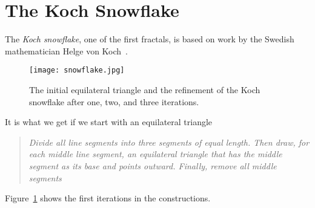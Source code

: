 \documentclass[12pt,a4paper]{article}
\begin{document}
\section{The Koch Snowflake}
The \emph{Koch snowflake}, one of the first fractals, is based on work by the Swedish mathematician
Helge von Koch~\cite{koch}.  
\begin{figure}[h] \label{koch}
  \centering
  \texttt{[image: snowflake.jpg]}
  \caption{The initial equilateral triangle and the refinement of the Koch snowflake after
	     one, two, and three iterations.}
\end{figure}
It is what we get if we start with an equilateral triangle
\begin{quote}
 \textit{Divide all line segments into three segments of equal length. Then draw, for
				          	   each middle line segment, an equilateral triangle that has the middle segment
					   as its base and points outward. Finally, remove all middle segments}
\end{quote}
Figure~\ref{koch} shows the first iterations in the constructions.

\end{document}
